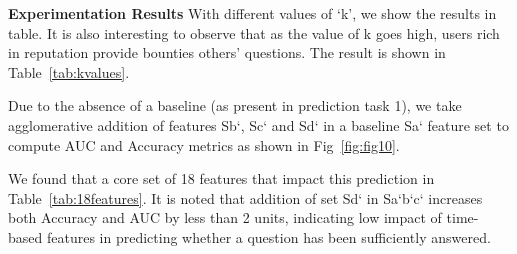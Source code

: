 \begin{table}[]
	\centering
	\small
	\caption{Important features for predicting task 2}
	\label{tab:18features}
\end{table}



\textbf{Experimentation Results}
With different values of ‘k’, we show the results in table. It is also interesting to observe that as the value of k goes high, users rich in reputation provide bounties others’ questions. The result is shown in Table~\ref{tab:kvalues}.

Due to the absence of a baseline (as present in prediction task 1), we take agglomerative addition of features Sb`, Sc` and Sd` in a baseline Sa` feature set to compute AUC and Accuracy metrics as shown in Fig~\ref{fig:fig10}.

We found that a core set of 18 features that impact this prediction in Table~\ref{tab:18features}. It is noted that addition of set Sd` in Sa`b`c` increases both Accuracy and AUC by less than 2 units, indicating low impact of time-based features in predicting whether a question has been sufficiently answered. 

